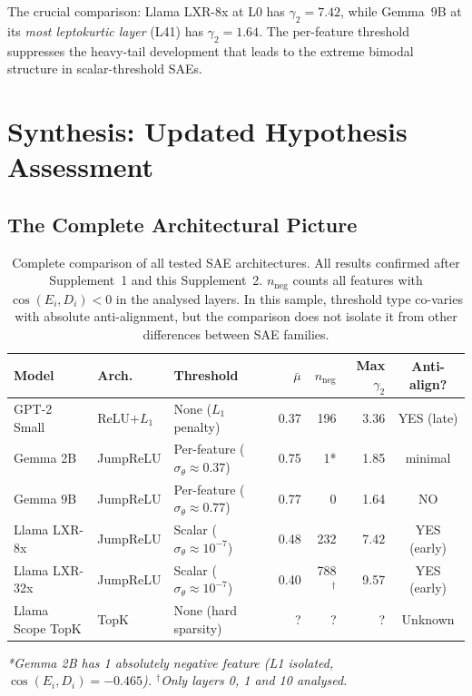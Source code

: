 \documentclass[11pt,a4paper]{article}
\newcommand{\cosED}{\cos(E_i, D_i)}
\begin{document}
The crucial comparison: Llama LXR-8x at L0 has $\gamma_2 = 7.42$, while Gemma~9B at its \emph{most leptokurtic layer} (L41) has $\gamma_2 = 1.64$. The per-feature threshold suppresses the heavy-tail development that leads to the extreme bimodal structure in scalar-threshold SAEs.

\section{Synthesis: Updated Hypothesis Assessment}
\label{sec:synthesis}

\subsection{The Complete Architectural Picture}

\begin{table}[H]
\centering
\caption{Complete comparison of all tested SAE architectures. All results confirmed after Supplement~1 and this Supplement~2. $n_\text{neg}$ counts all features with $\cosED<0$ in the analysed layers. In this sample, threshold type co-varies with absolute anti-alignment, but the comparison does not isolate it from other differences between SAE families.}
\label{tab:complete}
\small
\begin{tabular}{@{}lllrrrc@{}}
\toprule
Model & Arch. & Threshold & $\bar\mu$ & $n_\text{neg}$ & Max $\gamma_2$ & Anti-align? \\
\midrule
GPT-2 Small & ReLU$+L_1$ & None ($L_1$ penalty) & 0.37 & 196 & 3.36 & YES (late) \\
Gemma 2B & JumpReLU & Per-feature ($\sigma_\theta\approx0.37$) & 0.75 & 1* & 1.85 & minimal \\
Gemma 9B & JumpReLU & Per-feature ($\sigma_\theta\approx0.77$) & 0.77 & 0 & 1.64 & NO \\
Llama LXR-8x & JumpReLU & Scalar ($\sigma_\theta\approx10^{-7}$) & 0.48 & 232 & 7.42 & YES (early) \\
Llama LXR-32x & JumpReLU & Scalar ($\sigma_\theta\approx10^{-7}$) & 0.40 & 788$^\dagger$ & 9.57 & YES (early) \\
\midrule
Llama Scope TopK & TopK & None (hard sparsity) & ? & ? & ? & Unknown \\
\bottomrule
\end{tabular}
\vspace{0.3em}\small\textit{*Gemma 2B has 1 absolutely negative feature (L1 isolated, $\cosED=-0.465$). $^\dagger$Only layers 0, 1 and 10 analysed.}
\end{table}
\end{document}
